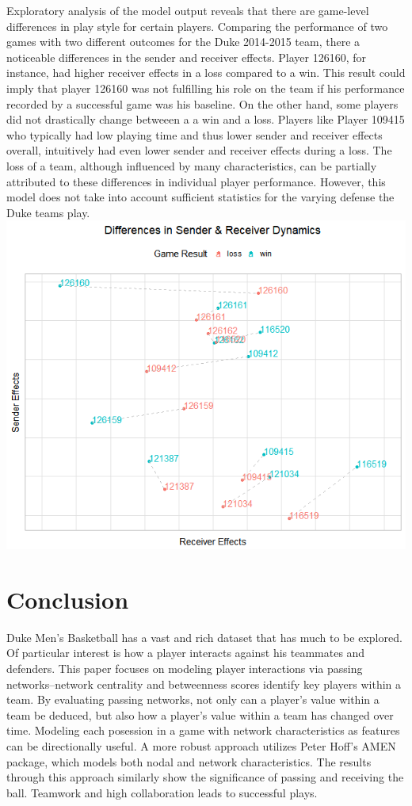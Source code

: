 \documentclass[12pt,twoside]{dukestatscithesis}
\theoremstyle{definition}
\theoremstyle{definition}
\theoremstyle{definition}
\theoremstyle{remark}
\begin{document}
Exploratory analysis of the model output reveals that there are
game-level differences in play style for certain players. Comparing the
performance of two games with two different outcomes for the Duke
2014-2015 team, there a noticeable differences in the sender and
receiver effects. Player 126160, for instance, had higher receiver
effects in a loss compared to a win. This result could imply that player
126160 was not fulfilling his role on the team if his performance
recorded by a successful game was his baseline. On the other hand, some
players did not drastically change betweeen a a win and a loss. Players
like Player 109415 who typically had low playing time and thus lower
sender and receiver effects overall, intuitively had even lower sender
and receiver effects during a loss. The loss of a team, although
influenced by many characteristics, can be partially attributed to these
differences in individual player performance. However, this model does
not take into account sufficient statistics for the varying defense the
Duke teams play.\\
\includegraphics{img/sendreceiver.png}

\chapter{Conclusion}\label{conclusion}

Duke Men's Basketball has a vast and rich dataset that has much to be
explored. Of particular interest is how a player interacts against his
teammates and defenders. This paper focuses on modeling player
interactions via passing networks--network centrality and betweenness
scores identify key players within a team. By evaluating passing
networks, not only can a player's value within a team be deduced, but
also how a player's value within a team has changed over time. Modeling
each posession in a game with network characteristics as features can be
directionally useful. A more robust approach utilizes Peter Hoff's AMEN
package, which models both nodal and network characteristics. The
results through this approach similarly show the significance of passing
and receiving the ball. Teamwork and high collaboration leads to
successful plays.
\end{document}
